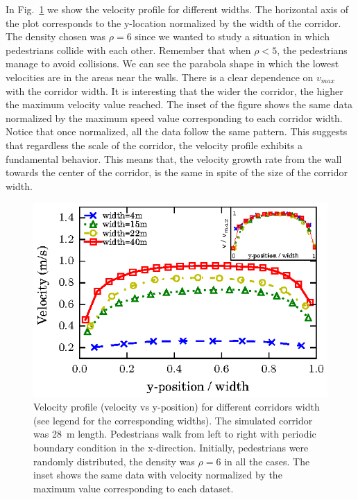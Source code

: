In Fig.~\ref{speed-profile-multi_width} we show the velocity profile for different widths. The horizontal axis of the plot corresponds to the y-location normalized by the width of the corridor. The density chosen was $\rho = 6$ since we wanted to study a situation in which pedestrians collide with each other. Remember that when $\rho<5$, the pedestrians manage to avoid collisions. We can see the parabola shape in which the lowest velocities are in the areas near the walls. There is a clear dependence on $v_{max}$ with the corridor width. It is interesting that the wider the corridor, the higher the maximum velocity value reached. The inset of the figure shows the same data normalized by the maximum speed value corresponding to each corridor width. Notice that once normalized, all the data follow the same pattern. This suggests that regardless the scale of the corridor, the velocity profile exhibits a fundamental behavior. This means that, the velocity growth rate from the wall towards the center of the corridor, is the same in spite of the size of the corridor width.

\begin{figure}[htbp!]
\includegraphics[width=\columnwidth]
{plots/v(y)_multi_width.eps}
\caption{\label{speed-profile-multi_width} Velocity profile (velocity vs y-position) for different corridors width (see legend for the corresponding widths). The simulated corridor was 28~m length. Pedestrians walk from left to right with periodic boundary condition in the x-direction. Initially, pedestrians were randomly distributed, the density was $\rho = 6$ in all the cases. The inset shows the same data with velocity normalized by the maximum value corresponding to each dataset. }
\end{figure}


